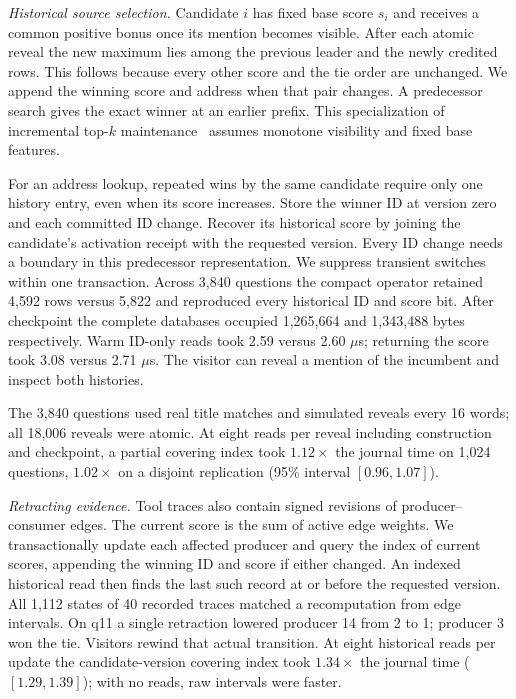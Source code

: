 \documentclass[conference]{IEEEtran}
\begin{document}
\textit{Historical source selection.} Candidate $i$ has fixed base score $s_i$ and receives a common positive bonus once its mention becomes visible. After each atomic reveal the new maximum lies among the previous leader and the newly credited rows. This follows because every other score and the tie order are unchanged. We append the winning score and address when that pair changes. A predecessor search gives the exact winner at an earlier prefix. This specialization of incremental top-$k$ maintenance~\cite{topk} assumes monotone visibility and fixed base features.

For an address lookup, repeated wins by the same candidate require only one history entry, even when its score increases. Store the winner ID at version zero and each committed ID change. Recover its historical score by joining the candidate's activation receipt with the requested version. Every ID change needs a boundary in this predecessor representation. We suppress transient switches within one transaction. Across 3,840 questions the compact operator retained 4,592 rows versus 5,822 and reproduced every historical ID and score bit. After checkpoint the complete databases occupied 1,265,664 and 1,343,488 bytes respectively. Warm ID-only reads took 2.59 versus 2.60 $\mu$s; returning the score took 3.08 versus 2.71 $\mu$s. The visitor can reveal a mention of the incumbent and inspect both histories.

The 3,840 questions used real title matches and simulated reveals every 16 words; all 18,006 reveals were atomic. At eight reads per reveal including construction and checkpoint, a partial covering index took $1.12\times$ the journal time on 1,024 questions, $1.02\times$ on a disjoint replication (95\% interval $[0.96,1.07]$).

\textit{Retracting evidence.} Tool traces also contain signed revisions of producer--consumer edges. The current score is the sum of active edge weights. We transactionally update each affected producer and query the index of current scores, appending the winning ID and score if either changed. An indexed historical read then finds the last such record at or before the requested version. All 1,112 states of 40 recorded traces matched a recomputation from edge intervals. On q11 a single retraction lowered producer 14 from 2 to 1; producer 3 won the tie. Visitors rewind that actual transition. At eight historical reads per update the candidate-version covering index took $1.34\times$ the journal time ($[1.29,1.39]$); with no reads, raw intervals were faster.
\end{document}
